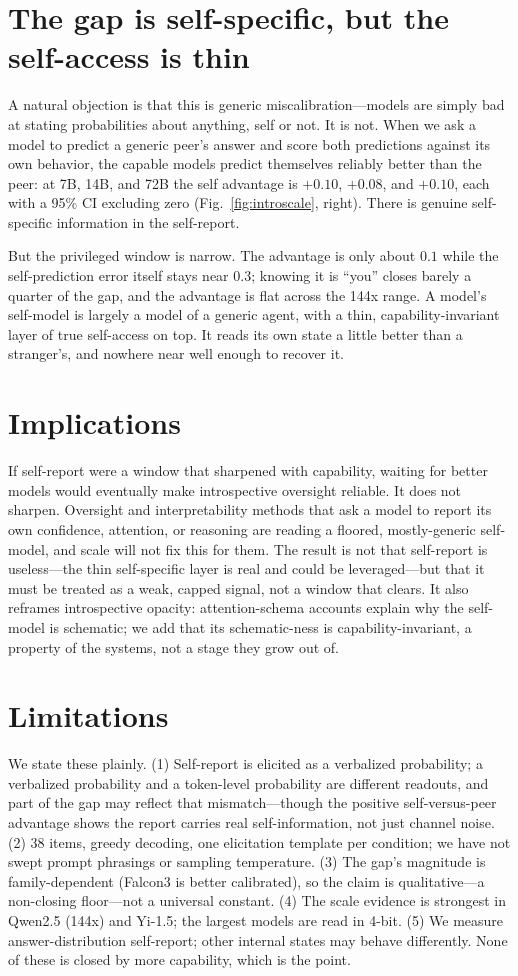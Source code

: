 \documentclass[10pt,twocolumn]{article}
\begin{document}
\section{The gap is self-specific, but the self-access is thin}
A natural objection is that this is generic miscalibration---models are simply bad at stating probabilities
about anything, self or not. It is not. When we ask a model to predict a generic peer's answer and score
both predictions against its own behavior, the capable models predict themselves reliably better than the
peer: at 7B, 14B, and 72B the self advantage is $+0.10$, $+0.08$, and $+0.10$, each with a 95\% CI excluding
zero (Fig.~\ref{fig:introscale}, right). There is genuine self-specific information in the self-report.

But the privileged window is narrow. The advantage is only about $0.1$ while the self-prediction error
itself stays near $0.3$; knowing it is ``you'' closes barely a quarter of the gap, and the advantage is
flat across the 144x range. A model's self-model is largely a model of a generic agent, with a thin,
capability-invariant layer of true self-access on top. It reads its own state a little better than a
stranger's, and nowhere near well enough to recover it.

\section{Implications}
If self-report were a window that sharpened with capability, waiting for better models would eventually make
introspective oversight reliable. It does not sharpen. Oversight and interpretability methods that ask a
model to report its own confidence, attention, or reasoning are reading a floored, mostly-generic self-model,
and scale will not fix this for them. The result is not that self-report is useless---the thin self-specific
layer is real and could be leveraged---but that it must be treated as a weak, capped signal, not a window
that clears. It also reframes introspective opacity: attention-schema accounts explain why the self-model is
schematic; we add that its schematic-ness is capability-invariant, a property of the systems, not a stage
they grow out of.

\section{Limitations}
We state these plainly. (1) Self-report is elicited as a verbalized probability; a verbalized probability and
a token-level probability are different readouts, and part of the gap may reflect that mismatch---though the
positive self-versus-peer advantage shows the report carries real self-information, not just channel noise.
(2) 38 items, greedy decoding, one elicitation template per condition; we have not swept prompt phrasings or
sampling temperature. (3) The gap's magnitude is family-dependent (Falcon3 is better calibrated), so the
claim is qualitative---a non-closing floor---not a universal constant. (4) The scale evidence is strongest in
Qwen2.5 (144x) and Yi-1.5; the largest models are read in 4-bit. (5) We measure answer-distribution
self-report; other internal states may behave differently. None of these is closed by more capability, which
is the point.
\end{document}
